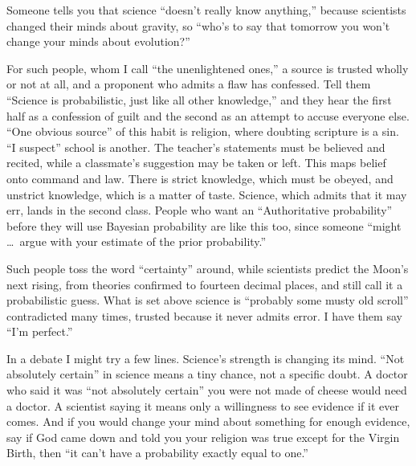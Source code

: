 
Someone tells you that science ``doesn't really know anything,'' because scientists changed their minds about gravity, so ``who's to say that tomorrow you won't change your minds about evolution?'' 

For such people, whom I call ``the unenlightened ones,'' a source is trusted wholly or not at all, and a proponent who admits a flaw has confessed. Tell them ``Science is probabilistic, just like all other knowledge,'' and they hear the first half as a confession of guilt and the second as an attempt to accuse everyone else. ``One obvious source'' of this habit is religion, where doubting scripture is a sin. ``I suspect'' school is another. The teacher's statements must be believed and recited, while a classmate's suggestion may be taken or left. This maps belief onto command and law. There is strict knowledge, which must be obeyed, and unstrict knowledge, which is a matter of taste. Science, which admits that it may err, lands in the second class. People who want an ``Authoritative probability'' before they will use Bayesian probability are like this too, since someone ``might \ldots\ argue with your estimate of the prior probability.'' 

Such people toss the word ``certainty'' around, while scientists predict the Moon's next rising, from theories confirmed to fourteen decimal places, and still call it a probabilistic guess. What is set above science is ``probably some musty old scroll'' contradicted many times, trusted because it never admits error. I have them say ``I'm perfect.'' 

In a debate I might try a few lines. Science's strength is changing its mind. ``Not absolutely certain'' in science means a tiny chance, not a specific doubt. A doctor who said it was ``not absolutely certain'' you were not made of cheese would need a doctor. A scientist saying it means only a willingness to see evidence if it ever comes. And if you would change your mind about something for enough evidence, say if God came down and told you your religion was true except for the Virgin Birth, then ``it can't have a probability exactly equal to one.'' 

